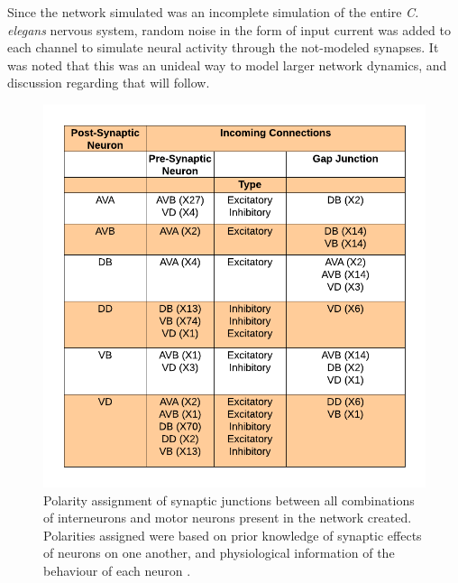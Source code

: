 \documentclass[11pt]{article} %
\begin{document}
Since the network simulated was an incomplete simulation of the entire \emph{C. elegans} nervous system, random noise in the form of input current was added to each channel to simulate neural activity through the not-modeled synapses. It was noted that this was an unideal way to model larger network dynamics, and discussion regarding that will follow.
\begin{figure}[h!]
\begin{center}
\includegraphics[scale=0.63]{motn_fig3.png} \caption[h3]{Polarity assignment of synaptic junctions between all combinations of interneurons and motor neurons present in the network created. Polarities assigned were based on prior knowledge \cite{White1986, Chen2006} of synaptic effects of neurons on one another, and physiological information of the behaviour of each neuron \cite{Altun2003, Chalfie1985}.} \label{fig:f3} \end{center}
\begin{center}

\end{center}
\end{figure}
\end{document}
